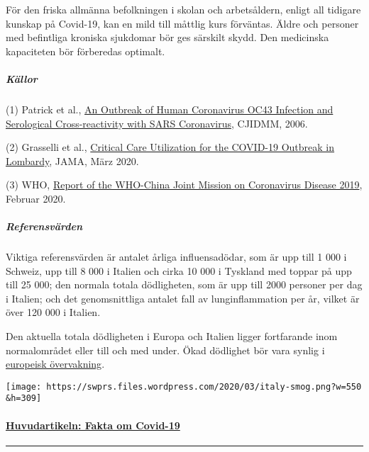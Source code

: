 För den friska allmänna befolkningen i skolan och arbetsåldern, enligt
all tidigare kunskap på Covid-19, kan en mild till måttlig kurs
förväntas. Äldre och personer med befintliga kroniska sjukdomar bör ges
särskilt skydd. Den medicinska kapaciteten bör förberedas optimalt.

\hypertarget{kuxe4llor}{%
\subparagraph{\texorpdfstring{\textbf{Källor}}{Källor}}\label{kuxe4llor}}

(1) Patrick et al.,
\href{https://www.ncbi.nlm.nih.gov/pmc/articles/PMC2095096/}{An Outbreak
of Human Coronavirus OC43 Infection and Serological Cross-reactivity
with SARS Coronavirus}, CJIDMM, 2006.

(2) Grasselli et al.,
\href{https://jamanetwork.com/journals/jama/fullarticle/2763188}{Critical
Care Utilization for the COVID-19 Outbreak in Lombardy}, JAMA, März
2020.

(3) WHO,
\href{https://www.who.int/docs/default-source/coronaviruse/who-china-joint-mission-on-covid-19-final-report.pdf}{Report
of the WHO-China Joint Mission on Coronavirus Disease 2019}, Februar
2020.

\hypertarget{referensvuxe4rden}{%
\subparagraph{\texorpdfstring{\textbf{Referensvärden}}{Referensvärden}}\label{referensvuxe4rden}}

Viktiga referensvärden är antalet årliga influensadödar, som är upp till
1 000 i Schweiz, upp till 8 000 i Italien och cirka 10 000 i Tyskland
med toppar på upp till 25 000; den normala totala dödligheten, som är
upp till 2000 personer per dag i Italien; och det genomsnittliga antalet
fall av lunginflammation per år, vilket är över 120 000 i Italien.

Den aktuella totala dödligheten i Europa och Italien ligger fortfarande
inom normalområdet eller till och med under. Ökad dödlighet bör vara
synlig i \href{https://www.euromomo.eu/index.html}{europeisk
övervakning}.

\texttt{[image: https://swprs.files.wordpress.com/2020/03/italy-smog.png?w=550\\\&h=309]}

\hypertarget{huvudartikeln-fakta-om-covid-19-1}{%
\paragraph{\texorpdfstring{\href{https://swprs.org/fakta-om-covid-19/}{Huvudartikeln:
Fakta om
Covid-19}}{Huvudartikeln: Fakta om Covid-19}}\label{huvudartikeln-fakta-om-covid-19-1}}

\begin{center}\rule{0.5\linewidth}{\linethickness}\end{center}

